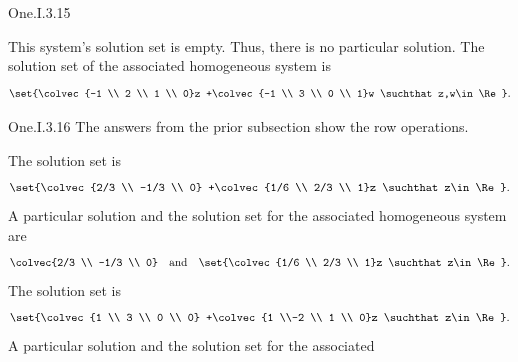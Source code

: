 \begin{ans}{One.I.3.15}
\begin{exparts}
        \partsitem This system's solution set is empty.
          Thus, there is no particular solution.
          The solution set of the associated homogeneous system is
          \begin{equation*}
            \set{\colvec{-1 \\ 2 \\ 1 \\ 0}z
                 +\colvec{-1 \\ 3 \\ 0 \\ 1}w
                 \suchthat z,w\in\Re}.
          \end{equation*}
      \end{exparts}
    
\end{ans}
\begin{ans}{One.I.3.16}
      The answers from the prior subsection show the row operations.
    \begin{exparts}
      \partsitem
        The solution set is
        \begin{equation*}
          \set{\colvec{2/3 \\ -1/3 \\ 0}
               +\colvec{1/6 \\ 2/3 \\ 1}z
              \suchthat z\in\Re}.
        \end{equation*}
        A particular solution and the solution set for the associated
        homogeneous system are
        \begin{equation*}
          \colvec{2/3 \\ -1/3 \\ 0}
            \quad\text{and}\quad
        \set{\colvec{1/6 \\ 2/3 \\ 1}z
            \suchthat z\in\Re}.
        \end{equation*}
      \partsitem
        The solution set is
        \begin{equation*}
          \set{\colvec{1 \\ 3 \\ 0 \\ 0}
               +\colvec{1 \\-2 \\ 1 \\ 0}z
              \suchthat z\in\Re}.
        \end{equation*}
        A particular solution and the solution set for the associated

\end{exparts}
\end{ans}
